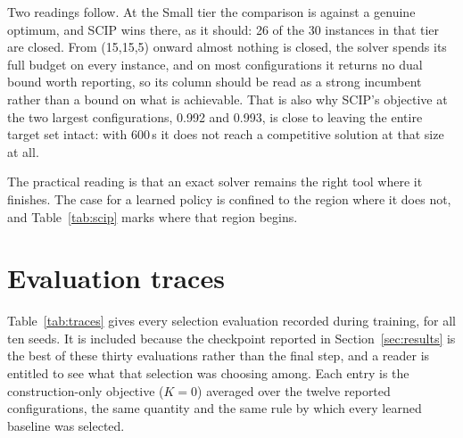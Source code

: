Two readings follow. At the Small tier the comparison is against a genuine
optimum, and SCIP wins there, as it should: 26 of the 30 instances in that
tier are closed. From (15,15,5) onward almost nothing is closed, the solver
spends its full budget on every instance, and on most configurations it
returns no dual bound worth reporting, so its column should be read as a
strong incumbent rather than a bound on what is achievable. That is also why
SCIP's objective at the two largest configurations, 0.992 and 0.993, is close
to leaving the entire target set intact: with 600\,s it does not reach a
competitive solution at that size at all.

The practical reading is that an exact solver remains the right tool where it
finishes. The case for a learned policy is confined to the region where it
does not, and Table~\ref{tab:scip} marks where that region begins.

\section{Evaluation traces}
\label{app:traces}

Table~\ref{tab:traces} gives every selection evaluation recorded during
training, for all ten seeds. It is included because the checkpoint reported in
Section~\ref{sec:results} is the best of these thirty evaluations rather than
the final step, and a reader is entitled to see what that selection was
choosing among. Each entry is the construction-only objective ($K{=}0$)
averaged over the twelve reported configurations, the same quantity and the
same rule by which every learned baseline was selected.

